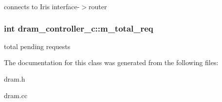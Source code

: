 \label{classdram__controller__c_a572404de89967a3b7294080ff7390110}
connects to Iris interface-\/$>$router \hypertarget{classdram__controller__c_a5b6f52c05df415ba22de7b0eab87acb0}{
\subsubsection[{m\_\-total\_\-req}]{\setlength{\rightskip}{0pt plus 5cm}int {\bf dram\_\-controller\_\-c::m\_\-total\_\-req}}}
\label{classdram__controller__c_a5b6f52c05df415ba22de7b0eab87acb0}
total pending requests 

The documentation for this class was generated from the following files:\begin{DoxyCompactItemize}
\item 
dram.h\item 
dram.cc\end{DoxyCompactItemize}
